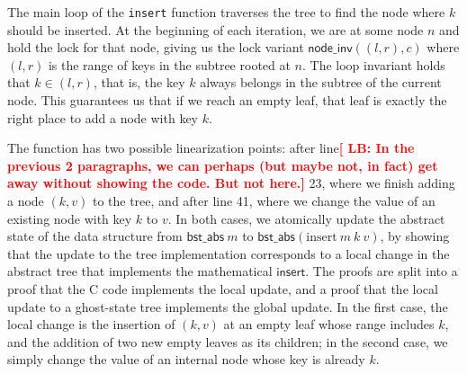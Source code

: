 \documentclass[runningheads]{llncs}
\newcommand{\LB}[1]{\textbf{\textcolor{red}{[ LB: #1]}}}
\newcommand{\treerep}{\ensuremath{\mathsf{bst\_abs}}}
\begin{document}
The main loop of the \lstinline{insert} function traverses the tree to find the node where $k$ should be inserted. At the beginning of each iteration, we are at some node $n$ and hold the lock for that node, giving us the lock variant $\mathsf{node\_inv}((l, r), c)$ where $(l, r)$ is the range of keys in the subtree rooted at $n$. The loop invariant holds that $k \in (l, r)$, that is, the key $k$ always belongs in the subtree of the current node. This guarantees us that if we reach an empty leaf, that leaf is exactly the right place to add a node with key $k$.

The function has two possible linearization points: after line\LB{In the previous 2 paragraphs, we can perhaps (but maybe not, in fact) get away without showing the code. But not here.} 23, where we finish adding a node $(k, v)$ to the tree, and after line 41, where we change the value of an existing node with key $k$ to $v$. In both cases, we atomically update the abstract state of the data structure from $\treerep\ m$ to $\treerep (\mathrm{insert}\ m\ k\ v)$, by showing that the update to the tree implementation corresponds to a local change in the abstract tree that implements the mathematical $\mathsf{insert}$. The proofs are split into a proof that the C code implements the local update, and a proof that the local update to a ghost-state tree implements the global update. In the first case, the local change is the insertion of $(k, v)$ at an empty leaf whose range includes $k$, and the addition of two new empty leaves as its children; in the second case, we simply change the value of an internal node whose key is already $k$. 
  
\end{document}
